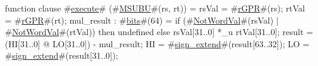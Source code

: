 function clause #\hyperref[zexecute]{execute}# (#\hyperref[zMSUBU]{MSUBU}#(rs, rt)) =
  {
    rsVal = #\hyperref[zrGPR]{rGPR}#(rs);
    rtVal = #\hyperref[zrGPR]{rGPR}#(rt);
    mul_result : #\hyperref[zbits]{bits}#(64) = if (#\hyperref[zNotWordVal]{NotWordVal}#(rsVal) | #\hyperref[zNotWordVal]{NotWordVal}#(rtVal)) then
        undefined
      else
	rsVal[31..0] *_u rtVal[31..0];
    result = (HI[31..0] @ LO[31..0]) - mul_result;
    HI = #\hyperref[zsignzyextend]{sign\_extend}#(result[63..32]);
    LO = #\hyperref[zsignzyextend]{sign\_extend}#(result[31..0]);
  }
